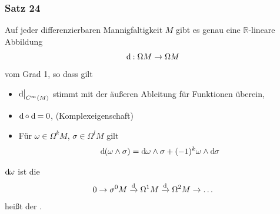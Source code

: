 \subsubsection{Satz 24} %
\label{ssub:531}
Auf jeder differenzierbaren Mannigfaltigkeit $M$ gibt es genau eine $\mathds{R}$-lineare Abbildung
\[
	\mathrm{d}\mkern-1.0mu  : \Omega M \to \Omega M
\]
vom Grad 1, so dass gilt
\begin{itemize}
	\item $\mathrm{d}\mkern-1.0mu \big|_{C^\infty(M)}$ stimmt mit der äußeren Ableitung für Funktionen überein,
	\item $\mathrm{d}\mkern-1.0mu  \circ \mathrm{d}\mkern-1.0mu  =0$, \hfill (Komplexeigenschaft)
	\item Für $\omega \in \Omega^k M$, $\sigma \in \Omega^l M$ gilt
	\[
		\mathrm{d}\mkern-1.0mu (\omega \wedge \sigma) = \mathrm{d}\mkern-1.0mu  \omega \wedge \sigma + (-1)^k \omega \wedge \mathrm{d}\mkern-1.0mu  \sigma
	\]
\end{itemize}
$\mathrm{d}\mkern-1.0mu  \omega$ ist die 
\[
	0 \to \sigma^0 M \xrightarrow{\mathrm{d}\mkern-1.0mu } \Omega^1 M \xrightarrow{\mathrm{d}\mkern-1.0mu} \Omega^2 M \to \ldots   
\] 
heißt der .
